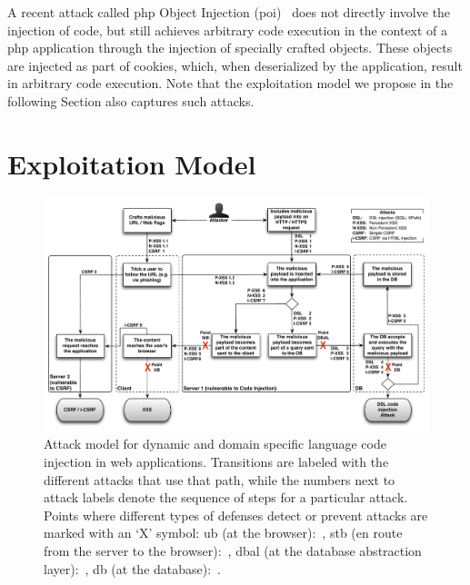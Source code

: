 \documentclass[conference]{IEEEtran}
\begin{document}
A recent attack called {\sc php} Object Injection
({\sc poi})~\cite{DKH14} does not directly involve
the injection of code, but still achieves arbitrary code execution
in the context of a {\sc php} application through the
injection of specially crafted objects.
These objects are injected as part of cookies,
which, when deserialized
by the application, result in arbitrary code execution.
Note that the exploitation model we propose
in the following Section also captures such attacks.

\section{Exploitation Model}
\label{sec:model}

\begin{figure}[t]
\begin{center}
\leavevmode
\includegraphics[scale=0.55]{attacks-steps-CSRF.pdf}
\end{center}
\caption{\label{fig:attacks}Attack model for dynamic and domain specific
language code injection in web applications.
Transitions are labeled with the different attacks that use that path,
while the numbers next to attack labels denote the 
sequence of steps for a particular attack.
Points where different types of defenses
detect or prevent attacks are marked with an `X' symbol:
{\sc ub} (at the browser):~\cite{KJKV09,LV09,TNH07,NSS06,APKLM10,ML10,YCIS07,PSC09,VDDPJ11,OWVS08,DDHPJ10,VFJKKV07,SLMS14,BV08,SSM10},
{\sc s}t{\sc b} (en route from the server to the browser):~\cite{RDWDE07,JKK06a,GC09,JB07,NLC07,WPLKK09,JEP08,PS11},
{\sc dbal} (at the database abstraction layer):~\cite{BWS05,SW06,HCF05,XBS06,PB05,PMP11,MS09,HO05,SMS13},
{\sc db} (at the database):~\cite{BK04,LLW02,VMV05}.}
\end{figure}
\end{document}
